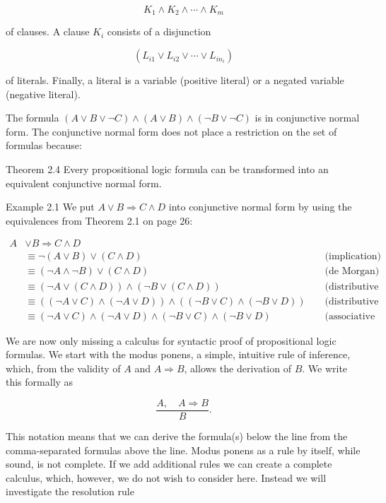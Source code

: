 \documentclass[10pt]{book}
\begin{document}
$$
K_{1} \wedge K_{2} \wedge \cdots \wedge K_{m}
$$

of clauses. A clause $K_{i}$ consists of a disjunction

$$
\left(L_{i 1} \vee L_{i 2} \vee \cdots \vee L_{i n_{i}}\right)
$$

of literals. Finally, a literal is a variable (positive literal) or a negated variable (negative literal).

The formula $(A \vee B \vee \neg C) \wedge(A \vee B) \wedge(\neg B \vee \neg C)$ is in conjunctive normal form. The conjunctive normal form does not place a restriction on the set of formulas because:

Theorem 2.4 Every propositional logic formula can be transformed into an equivalent conjunctive normal form.

Example 2.1 We put $A \vee B \Rightarrow C \wedge D$ into conjunctive normal form by using the equivalences from Theorem 2.1 on page 26:

$$
\begin{aligned}
A & \vee B \Rightarrow C \wedge D & & \\
& \equiv \neg(A \vee B) \vee(C \wedge D) & & \text { (implication) } \\
& \equiv(\neg A \wedge \neg B) \vee(C \wedge D) & & \text { (de Morgan) } \\
& \equiv(\neg A \vee(C \wedge D)) \wedge(\neg B \vee(C \wedge D)) & & \text { (distributive law) } \\
& \equiv((\neg A \vee C) \wedge(\neg A \vee D)) \wedge((\neg B \vee C) \wedge(\neg B \vee D)) & & \text { (distributive law) } \\
& \equiv(\neg A \vee C) \wedge(\neg A \vee D) \wedge(\neg B \vee C) \wedge(\neg B \vee D) & & \text { (associative law) }
\end{aligned}
$$

We are now only missing a calculus for syntactic proof of propositional logic formulas. We start with the modus ponens, a simple, intuitive rule of inference, which, from the validity of $A$ and $A \Rightarrow B$, allows the derivation of $B$. We write this formally as

$$
\frac{A, \quad A \Rightarrow B}{B} .
$$

This notation means that we can derive the formula(s) below the line from the comma-separated formulas above the line. Modus ponens as a rule by itself, while sound, is not complete. If we add additional rules we can create a complete calculus, which, however, we do not wish to consider here. Instead we will investigate the resolution rule
\end{document}
